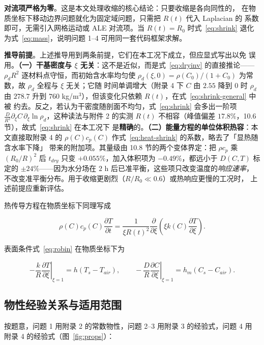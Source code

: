 \textbf{对流项严格为零}。这是本文处理收缩的核心结论：只要收缩是各向同性的，
在物质坐标下移动边界问题就化为固定域问题，只需把 $R(t)$ 代入 Laplacian 的
系数即可，无需引入网格运动或 ALE 对流项。当 $R(t)=R_0$ 时式~\eqref{eq:shrink}
退化为式~\eqref{eq:mass}，说明问题 1--4 可用同一套代码框架求解。

\textbf{推导前提}。上述推导用到两条前提，它们在本工况下成立，但应显式写出以免
误用。\textbf{（一）干基密度与 $\xi$ 无关}：这不是近似，而是式~\eqref{eq:dryinv}
的直接推论——$\rho_dR^2$ 逐材料点守恒，而初始含水率均匀使
$\rho_d(\xi,0)=\rho(C_0)/(1+C_0)$ 为常数，故 $\rho_d$ 全程与 $\xi$ 无关；它随
时间单调增大（附录 4 下 $C$ 由 $2.55$ 降到 $0$ 时 $\rho_d$ 由 $278.7$ 升到
$760$ kg/m$^3$），但该变化只依赖 $R(t)$，在式~\eqref{eq:shrink-general} 中被
约去。反之，若认为干密度随剖面不均匀，式~\eqref{eq:shrink} 会多出一阶项
$\frac{D}{R^2}\partial_\xi C\,\partial_\xi\ln\rho_d$，这种读法与附件 2 的实测
$R(t)$ 不相容（峰值偏差 $17.8\%$，10.6 节），故式~\eqref{eq:shrink} 在本工况下
是\textbf{精确}的。\textbf{（二）能量方程的单位体积热容}：本文直接取附录 4 的
$\rho(C)c_p(C)$ 作式~\eqref{eq:heat-shrink} 的系数，略去了「显热随含水率下降」
带来的附加项。其量级由 10.8 节的两个变体界定：把 $\rho c_p$ 乘 $(R_0/R)^2$ 后
$t_{dry}$ 只变 $+0.055\%$，加入体积项为 $-0.49\%$，都远小于 $D(C,T)$ 标定的
$\pm24\%$——因为水分场在 $2$ h 后已准平衡，这些项只改变温度的\emph{响应速率}，
不改变准平衡分布。用于收缩更剧烈（$R/R_0\ll0.6$）或热响应更慢的工况时，
上述前提应重新评估。

热传导方程在物质坐标下同理写成

\begin{equation}
\rho(C)c_p(C)\frac{\partial T}{\partial t}
=\frac{1}{\xi R(t)^2}\frac{\partial}{\partial \xi}
\left(\xi k(C)\frac{\partial T}{\partial \xi}\right).
\label{eq:heat-shrink}
\end{equation}

表面条件式~\eqref{eq:robin} 在物质坐标下为

\begin{equation}
-\frac{k}{R}\left.\frac{\partial T}{\partial \xi}\right|_{\xi=1}
=h\left(T_s-T_{air}\right),\qquad
-\frac{D}{R}\left.\frac{\partial C}{\partial \xi}\right|_{\xi=1}
=h_m\left(C_s-C_{air}\right).
\end{equation}

\subsection{物性经验关系与适用范围}

按题意，问题 1 用附录 2 的常数物性，问题 2--3 用附录 3 的经验式，问题 4 用
附录 4 的经验式（图~\ref{fig:props}）：

